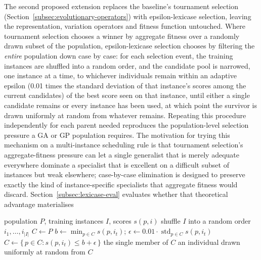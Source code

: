 The second proposed extension replaces the baseline's tournament selection
(Section~\ref{subsec:evolutionary-operators}) with epsilon-lexicase
selection, leaving
the representation, variation operators and fitness
function untouched. Where tournament selection chooses a winner by
aggregate fitness over a randomly drawn subset of the population,
epsilon-lexicase selection chooses by filtering the \emph{entire}
population down case by case: for each selection event, the training
instances are shuffled into a random order, and the candidate pool is
narrowed, one instance at a time, to whichever individuals remain within an
adaptive epsilon (0.01 times the standard deviation of that instance's
scores among the current candidates) of the best score seen on that
instance, until either a single candidate remains or every instance has
been used, at which point the survivor is drawn uniformly at random from
whatever remains. Repeating this procedure independently for each parent
needed reproduces the population-level selection pressure a GA or GP
population requires.  The motivation for trying this mechanism on a
multi-instance scheduling rule is that tournament selection's
aggregate-fitness pressure can let a single generalist that is merely
adequate everywhere dominate a specialist that is excellent on a difficult
subset of instances but weak elsewhere; case-by-case elimination is
designed to preserve exactly the kind of instance-specific specialists that
aggregate fitness would discard. Section~\ref{subsec:lexicase-eval}
evaluates whether that theoretical advantage materialises

\begin{algorithm}[htbp]
\caption[Epsilon-lexicase selection]{}
\label{alg:lexicase}
\begin{algorithmic}[1]
\Require population $P$, training instances $I$, scores $s(p,i)$
\State shuffle $I$ into a random order $i_1, \dots, i_{|I|}$
\State $C \gets P$ 
  \State $b \gets \min_{p \in C} s(p, i_t)$;\quad
  $\epsilon \gets 0.01 \cdot \operatorname{std}_{p \in C} s(p, i_t)$
  \State $C \gets \{\, p \in C : s(p, i_t) \le b + \epsilon \,\}$
   \State \Return the single member of $C$ \EndIf
\EndFor
\State \Return an individual drawn uniformly at random from $C$
\end{algorithmic}
\end{algorithm}


